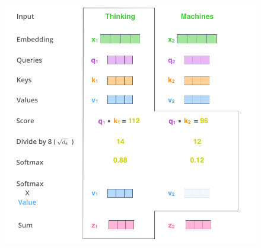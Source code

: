 \begin{figure}[h]
  \centering
  \includegraphics[scale=0.3]{pics/self-attention-output.png}
\end{figure}

